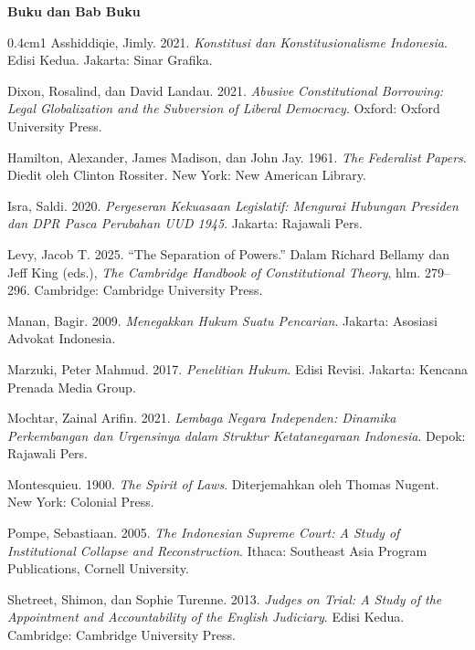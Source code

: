\documentclass[12pt,a4paper,twocolumn]{article}
\begin{document}
\vspace{0.2em}
\noindent \textbf{Buku dan Bab Buku}
\begin{hangparas}{0.4cm}{1}
    Asshiddiqie, Jimly. 2021. \textit{Konstitusi dan Konstitusionalisme Indonesia}. Edisi Kedua. Jakarta: Sinar Grafika.

    Dixon, Rosalind, dan David Landau. 2021. \textit{Abusive Constitutional Borrowing: Legal Globalization and the Subversion of Liberal Democracy}. Oxford: Oxford University Press.

    Hamilton, Alexander, James Madison, dan John Jay. 1961. \textit{The Federalist Papers}. Diedit oleh Clinton Rossiter. New York: New American Library.

    Isra, Saldi. 2020. \textit{Pergeseran Kekuasaan Legislatif: Mengurai Hubungan Presiden dan DPR Pasca Perubahan UUD 1945}. Jakarta: Rajawali Pers.

    Levy, Jacob T. 2025. ``The Separation of Powers.'' Dalam Richard Bellamy dan Jeff King (eds.), \textit{The Cambridge Handbook of Constitutional Theory}, hlm. 279--296. Cambridge: Cambridge University Press.

    Manan, Bagir. 2009. \textit{Menegakkan Hukum Suatu Pencarian}. Jakarta: Asosiasi Advokat Indonesia.

    Marzuki, Peter Mahmud. 2017. \textit{Penelitian Hukum}. Edisi Revisi. Jakarta: Kencana Prenada Media Group.

    Mochtar, Zainal Arifin. 2021. \textit{Lembaga Negara Independen: Dinamika Perkembangan dan Urgensinya dalam Struktur Ketatanegaraan Indonesia}. Depok: Rajawali Pers.

    Montesquieu. 1900. \textit{The Spirit of Laws}. Diterjemahkan oleh Thomas Nugent. New York: Colonial Press.

    Pompe, Sebastiaan. 2005. \textit{The Indonesian Supreme Court: A Study of Institutional Collapse and Reconstruction}. Ithaca: Southeast Asia Program Publications, Cornell University.

    Shetreet, Shimon, dan Sophie Turenne. 2013. \textit{Judges on Trial: A Study of the Appointment and Accountability of the English Judiciary}. Edisi Kedua. Cambridge: Cambridge University Press.
\end{hangparas}
\end{document}
